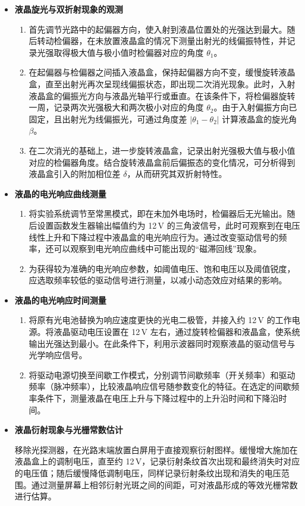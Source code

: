 \documentclass[a4paper, 1.5lines]{ctexart}
\begin{document}
\begin{itemize}
    \item \textbf{液晶旋光与双折射现象的观测}
    \begin{enumerate}
        \item 首先调节光路中的起偏器方向，使入射到液晶位置处的光强达到最大。随后转动检偏器，在未放置液晶盒的情况下测量出射光的线偏振特性，并记录光强取得极大值与极小值时检偏器对应的角度 $\theta_1$。
        \item 在起偏器与检偏器之间插入液晶盒，保持起偏器方向不变，缓慢旋转液晶盒，直至出射光再次呈现线偏振状态，即出现二次消光现象。此时，入射液晶盒的偏振光方向与液晶光轴平行或垂直。在该条件下，将检偏器旋转一周，记录两次光强极大和两次极小对应的角度 $\theta_2$。由于入射偏振方向已固定，且出射光为线偏振光，可通过角度差 $|\theta_1-\theta_2|$ 计算液晶盒的旋光角 $\beta$。
        \item 在二次消光的基础上，进一步旋转液晶盒，记录出射光强极大值与极小值对应的检偏器角度。结合旋转液晶盒前后偏振态的变化情况，可分析得到液晶盒引入的附加相位差 $\delta$，从而研究其双折射特性。
    \end{enumerate}

    \item \textbf{液晶的电光响应曲线测量}
    \begin{enumerate}
        \item 将实验系统调节至常黑模式，即在未加外电场时，检偏器后无光输出。随后设置函数发生器输出幅值约为 12\,V 的三角波信号，此时可观察到在电压线性上升和下降过程中液晶盒的电光响应行为。通过改变驱动信号的频率，还可以观察到电光响应曲线中可能出现的“磁滞回线”现象。
        \item 为获得较为准确的电光响应参数，如阈值电压、饱和电压以及阈值锐度，应选取频率较低的驱动信号进行测量，以减小动态效应对结果的影响。
    \end{enumerate}

    \item \textbf{液晶的电光响应时间测量}
    \begin{enumerate}
        \item 将原有光电池替换为响应速度更快的光电二极管，并接入约 12\,V 的工作电源。将液晶驱动电压设置在 12\,V 左右，通过旋转检偏器和液晶盒，使系统输出光强达到最小。在此条件下，利用示波器同时观察液晶的驱动信号与光学响应信号。
        \item 将驱动电源切换至间歇工作模式，分别调节间歇频率（开关频率）和驱动频率（脉冲频率），比较液晶响应信号随参数变化的特征。在选定的间歇频率条件下，测量液晶在电压上升与下降过程中的上升沿时间和下降沿时间。
    \end{enumerate}

    \item \textbf{液晶衍射现象与光栅常数估计}

    移除光探测器，在光路末端放置白屏用于直接观察衍射图样。缓慢增大施加在液晶盒上的调制电压，直至约 12\,V，记录衍射条纹首次出现和最终消失时对应的电压值；随后缓慢降低调制电压，同样记录衍射条纹出现和消失的电压范围。通过测量屏幕上相邻衍射光斑之间的间距，可对液晶形成的等效光栅常数进行估算。
\end{itemize}
\end{document}
